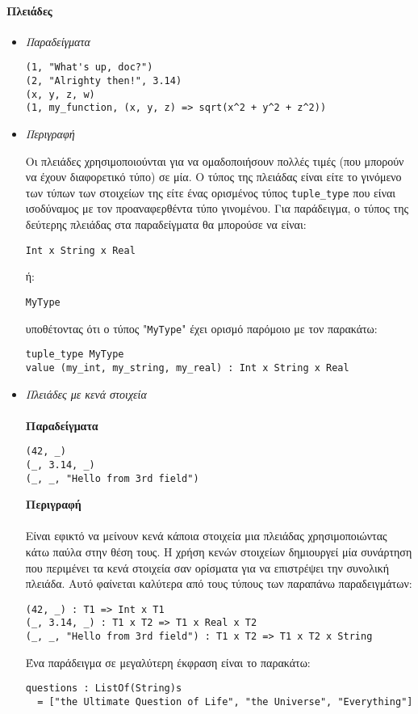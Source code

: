 \documentclass[diploma]{softlab-thesis}
\begin{document}
\paragraph{Πλειάδες}

\begin{itemize}

\item \textit{Παραδείγματα}
\begin{verbatim}
(1, "What's up, doc?")
(2, "Alrighty then!", 3.14)
(x, y, z, w)
(1, my_function, (x, y, z) => sqrt(x^2 + y^2 + z^2))
\end{verbatim}

\item \textit{Περιγραφή}

Οι πλειάδες χρησιμοποιούνται για να ομαδοποιήσουν πολλές τιμές (που μπορούν
να έχουν διαφορετικό τύπο) σε μία. Ο τύπος της πλειάδας είναι είτε το γινόμενο
των τύπων των στοιχείων της είτε ένας ορισμένος τύπος \verb|tuple_type|
που είναι ισοδύναμος με τον προαναφερθέντα τύπο γινομένου.
Για παράδειγμα, ο τύπος της δεύτερης πλειάδας στα παραδείγματα θα μπορούσε να
είναι:
\begin{verbatim}
Int x String x Real
\end{verbatim}
ή:
\begin{verbatim}
MyType
\end{verbatim}
υποθέτοντας ότι ο τύπος "\verb|MyType|" έχει ορισμό παρόμοιο με τον παρακάτω:
\begin{verbatim}
tuple_type MyType
value (my_int, my_string, my_real) : Int x String x Real
\end{verbatim}

\newpage
\item \textit{Πλειάδες με κενά στοιχεία}
\\\\
\textbf{Παραδείγματα}
\begin{verbatim}
(42, _)
(_, 3.14, _)
(_, _, "Hello from 3rd field")
\end{verbatim}

\textbf{Περιγραφή}
\\\\
Είναι εφικτό να μείνουν κενά κάποια στοιχεία μια πλειάδας χρησιμοποιώντας
κάτω παύλα στην θέση τους. Η χρήση κενών στοιχείων δημιουργεί μία συνάρτηση
που περιμένει τα κενά στοιχεία σαν ορίσματα για να επιστρέψει την συνολική
πλειάδα. Αυτό φαίνεται καλύτερα από τους τύπους των παραπάνω παραδειγμάτων:
\begin{verbatim}
(42, _) : T1 => Int x T1
(_, 3.14, _) : T1 x T2 => T1 x Real x T2
(_, _, "Hello from 3rd field") : T1 x T2 => T1 x T2 x String
\end{verbatim}
Ένα παράδειγμα σε μεγαλύτερη έκφραση είναι το παρακάτω:
\begin{verbatim}
questions : ListOf(String)s
  = ["the Ultimate Question of Life", "the Universe", "Everything"]


\end{verbatim}
\end{itemize}
\end{document}
